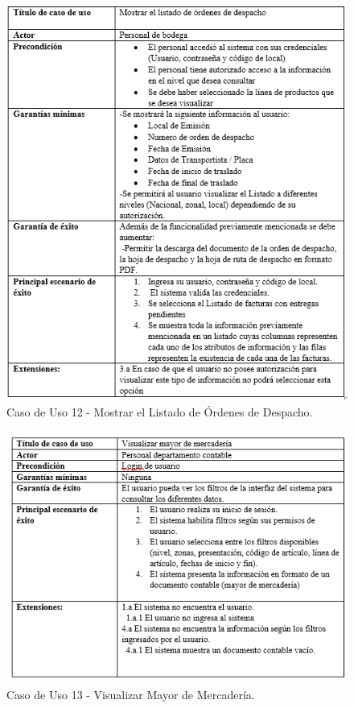 \documentclass{scrreprt}
\begin{document}
\begin{figure}[!htpb]
    \centerline{\includegraphics[scale=.75]{images/case_stiff/12.png}}
    \caption{Caso de Uso 12 - Mostrar el Listado de Órdenes de Despacho.}
    \label{fig}
\end{figure}
\FloatBarrier

\begin{figure}[!htpb]
    \centerline{\includegraphics[scale=.90]{images/case_stiff/13.png}}
    \caption{Caso de Uso 13 - Visualizar Mayor de Mercadería.}
    \label{fig}
\end{figure}
\FloatBarrier
\end{document}
